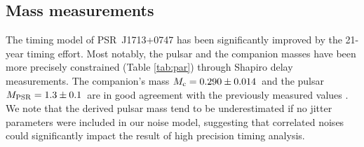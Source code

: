 





\subsection{Mass measurements}
\label{sec:mass}
The timing model of PSR~J1713+0747 has been significantly improved by the 21-year timing effort.
Most notably, the pulsar and the companion masses have been more precisely
constrained (Table \ref{tab:par}) through Shapiro delay measurements. The
companion's mass $M_{\rm c} = 0.290\pm0.014$~\Msun and the pulsar $M_{\rm
PSR}=1.3\pm0.1$~\Msun are in good agreement with the previously measured values \cite{sns+05}.
We note that the derived pulsar mass tend to be underestimated 
if no jitter parameters were included in our noise model, suggesting that
correlated noises could significantly impact the result of high
precision timing analysis.



